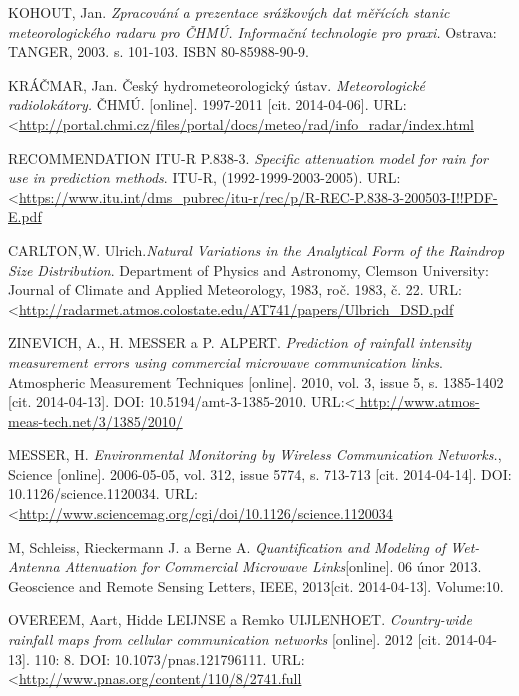 \documentclass[a4paper,12pt,oneside]{report}
\begin{document}
\begin{thebibliography}{99}

KOHOUT, Jan. \textit{Zpracování a prezentace srážkových dat měřících stanic meteorologického radaru pro ČHMÚ. Informační technologie pro praxi.}
Ostrava: TANGER, 2003. s. 101-103. ISBN 80-85988-90-9.

KRÁČMAR, Jan. Český hydrometeorologický ústav. \textit{Meteorologické radiolokátory.} 
ČHMÚ. [online]. 1997-2011 [cit. 2014-04-06]. URL:\textless \url{http://portal.chmi.cz/files/portal/docs/meteo/rad/info_radar/index.html}

RECOMMENDATION ITU-R P.838-3. \textit{Specific attenuation model for rain for use in prediction methods}. 
ITU-R, (1992-1999-2003-2005). URL:\textless\url {https://www.itu.int/dms_pubrec/itu-r/rec/p/R-REC-P.838-3-200503-I!!PDF-E.pdf}

CARLTON,W. Ulrich.\textit {Natural Variations in the Analytical Form of the Raindrop Size Distribution}. 
Department of Physics and Astronomy, Clemson University: Journal of Climate and Applied Meteorology, 1983, roč. 1983, č. 22. URL:\textless\url {http://radarmet.atmos.colostate.edu/AT741/papers/Ulbrich_DSD.pdf}

ZINEVICH, A., H. MESSER a P. ALPERT. \textit {Prediction of rainfall intensity measurement errors using commercial microwave communication links}. Atmospheric Measurement Techniques [online]. 2010, vol. 3, issue 5, s. 1385-1402 [cit. 2014-04-13]. DOI: 10.5194/amt-3-1385-2010. URL:\textless\url { http://www.atmos-meas-tech.net/3/1385/2010/}

MESSER, H. \textit {Environmental Monitoring by Wireless Communication Networks.}, Science [online]. 2006-05-05, vol. 312, issue 5774, s. 713-713 [cit. 2014-04-14]. DOI: 10.1126/science.1120034. URL:\textless\url {http://www.sciencemag.org/cgi/doi/10.1126/science.1120034}

M, Schleiss, Rieckermann J. a Berne A.  \textit{Quantification and Modeling of Wet-Antenna Attenuation for Commercial Microwave Links}[online]. 06 únor 2013. Geoscience and Remote Sensing Letters, IEEE, 2013[cit. 2014-04-13]. Volume:10. 

OVEREEM, Aart, Hidde LEIJNSE a Remko UIJLENHOET.  \textit{Country-wide rainfall maps from cellular communication networks} [online]. 2012 [cit. 2014-04-13]. 110: 8. DOI: 10.1073/pnas.121796111. URL:\textless\url {http://www.pnas.org/content/110/8/2741.full}


\end{thebibliography}
\end{document}
